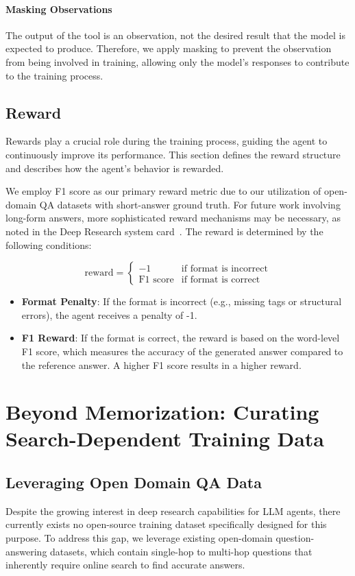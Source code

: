 \documentclass{article}
\begin{document}
\paragraph{Masking Observations}
The output of the tool is an observation, not the desired result that the model is expected to produce. Therefore, we apply masking to prevent the observation from being involved in training, allowing only the model's responses to contribute to the training process.


\subsection{Reward}
Rewards play a crucial role during the training process, guiding the agent to continuously improve its performance. This section defines the reward structure and describes how the agent's behavior is rewarded.

We employ F1 score as our primary reward metric due to our utilization of open-domain QA datasets with short-answer ground truth. For future work involving long-form answers, more sophisticated reward mechanisms may be necessary, as noted in the Deep Research system card~\cite{openai2025deep}. The reward is determined by the following conditions:

\[
\text{reward} = 
\begin{cases}
-1 & \text{if format is incorrect} \\
\text{F1 score} & \text{if format is correct}
\end{cases}
\]

\begin{itemize}
  \item \textbf{Format Penalty}: If the format is incorrect (e.g., missing tags or structural errors), the agent receives a penalty of -1.
  \item \textbf{F1 Reward}: If the format is correct, the reward is based on the word-level F1 score, which measures the accuracy of the generated answer compared to the reference answer. A higher F1 score results in a higher reward.
\end{itemize}


\section{Beyond Memorization: Curating Search-Dependent Training Data}
\label{sec:training_data}
\subsection{Leveraging Open Domain QA Data}
Despite the growing interest in deep research capabilities for LLM agents, there currently exists no open-source training dataset specifically designed for this purpose. To address this gap, we leverage existing open-domain question-answering datasets, which contain single-hop to multi-hop questions that inherently require online search to find accurate answers. 
\end{document}
